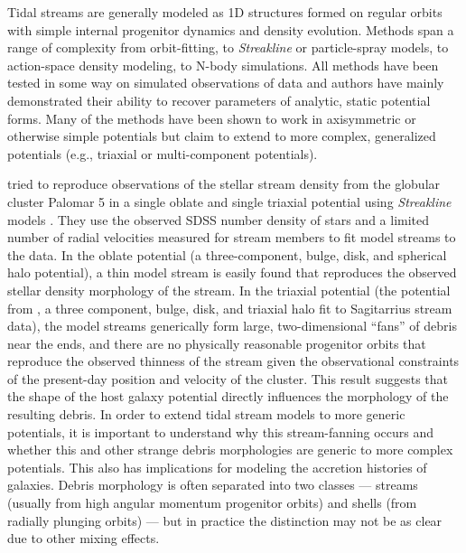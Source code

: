 \documentclass[letterpaper,12pt,preprint]{aastex}
\begin{document}
Tidal streams are generally modeled as 1D structures formed on regular orbits with simple internal progenitor dynamics and density evolution. Methods span a range of complexity from orbit-fitting, to \emph{Streakline} or particle-spray models, to action-space density modeling, to N-body simulations. All methods have been tested in some way on simulated observations of data and authors have mainly demonstrated their ability to recover parameters of analytic, static potential forms. Many of the methods have been shown to work in axisymmetric or otherwise simple potentials but claim to extend to more complex, generalized potentials (e.g., triaxial or multi-component potentials). 

\citet{pearson15} tried to reproduce observations of the stellar stream density from the globular cluster Palomar 5 in a single oblate and single triaxial potential using \emph{Streakline} models \citep{kuepper12}. They use the observed SDSS number density of stars and a limited number of radial velocities measured for stream members to fit model streams to the data. In the oblate potential (a three-component, bulge, disk, and spherical halo potential), a thin model stream is easily found that reproduces the observed stellar density morphology of the stream. In the triaxial potential (the potential from \cite{law10}, a three component, bulge, disk, and triaxial halo fit to Sagitarrius stream data), the model streams generically form large, two-dimensional ``fans'' of debris near the ends, and there are no physically reasonable progenitor orbits that reproduce the observed thinness of the stream given the observational constraints of the present-day position and velocity of the cluster. This result suggests that the shape of the host galaxy potential directly influences the morphology of the resulting debris. In order to extend tidal stream models to more generic potentials, it is important to understand why this stream-fanning occurs and whether this and other strange debris morphologies are generic to more complex potentials. This also has implications for modeling the accretion histories of galaxies. Debris morphology is often separated into two classes --- streams (usually from high angular momentum progenitor orbits) and shells (from radially plunging orbits) --- but in practice the distinction may not be as clear due to other mixing effects.
\end{document}
